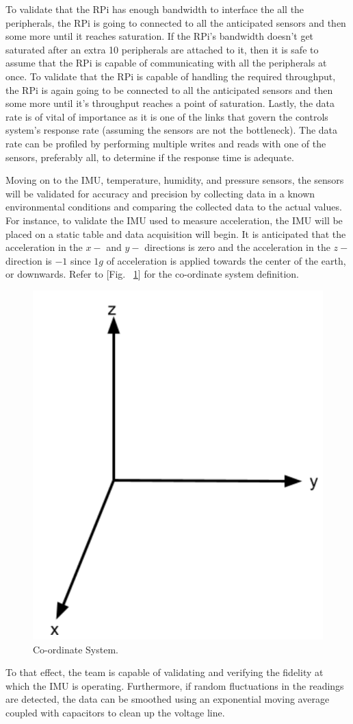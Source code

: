 To validate that the RPi has enough bandwidth to interface the all the peripherals, the RPi is going to connected to all the anticipated sensors and then some more until it reaches saturation. If the RPi's bandwidth doesn't get saturated after an extra 10 peripherals are attached to it, then it is safe to assume that the RPi is capable of communicating with all the peripherals at once.
To validate that the RPi is capable of handling the required throughput, the RPi is again going to be connected to all the anticipated sensors and then some more until it's throughput reaches a point of saturation.
Lastly, the data rate is of vital of importance as it is one of the links that govern the controls system's response rate (assuming the sensors are not the bottleneck). The data rate can be profiled by performing multiple writes and reads with one of the sensors, preferably all, to determine if the response time is adequate.

Moving on to the IMU, temperature, humidity, and pressure sensors, the sensors will be validated for accuracy and precision by collecting data in a known environmental conditions and comparing the collected data to the actual values. For instance, to validate the IMU used to measure acceleration, the IMU will be placed on a static table and data acquisition will begin. It is anticipated that the acceleration in the $x-$ and $y-$ directions is zero and the acceleration in the $z-$ direction is $-1$ since $1g$ of acceleration is applied towards the center of the earth, or downwards. Refer to [Fig. ~\ref{fig:coordinate_system}] for the co-ordinate system definition.

\begin{figure}[H]
  \centering
  \includegraphics[width=.3\textwidth]{Controls/coordinate_system.png}
  \caption{\label{fig:coordinate_system} Co-ordinate System.}
\end{figure}

To that effect, the team is capable of validating and verifying the fidelity at which the IMU is operating. Furthermore, if random fluctuations in the readings are detected, the data can be smoothed using an exponential moving average coupled with capacitors to clean up the voltage line.

